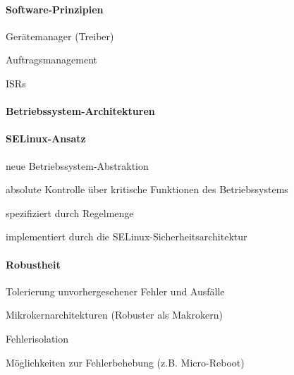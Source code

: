 \documentclass[a4paper]{article}
\begin{document}
\begin{multicols}{3}
  \paragraph{Software-Prinzipien}
  Gerätemanager (Treiber)
  \begin{itemize*}
    \item Auftragsmanagement
    \item ISRs
  \end{itemize*}

  \paragraph{Betriebssystem-Architekturen}

  \paragraph{SELinux-Ansatz} neue Betriebssystem-Abstraktion
  \begin{itemize*}
    \item absolute Kontrolle über kritische Funktionen des Betriebssystems
    \item spezifiziert durch Regelmenge
    \item implementiert durch die SELinux-Sicherheitsarchitektur
  \end{itemize*}

  \paragraph{Robustheit} Tolerierung unvorhergesehener Fehler und Ausfälle
  \begin{itemize*}
    \item Mikrokernarchitekturen (Robuster als Makrokern)
    \item Fehlerisolation
    \item Möglichkeiten zur Fehlerbehebung (z.B. Micro-Reboot)
  \end{itemize*}


\end{multicols}
\end{document}
